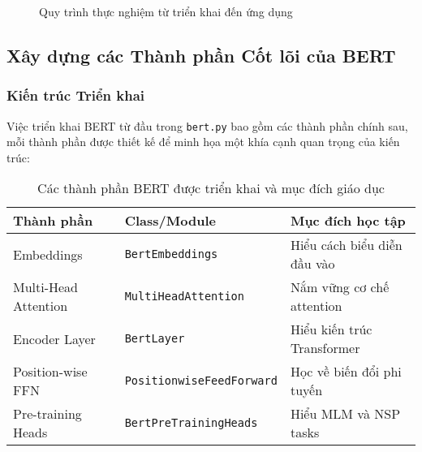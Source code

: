 \begin{figure}[H]
\centering
{}
\caption{Quy trình thực nghiệm từ triển khai đến ứng dụng}
\label{fig:experiment_workflow}
\end{figure}

\subsection{Xây dựng các Thành phần Cốt lõi của BERT}
\label{ssec:xay_dung_cot_loi}

\subsubsection{Kiến trúc Triển khai}
Việc triển khai BERT từ đầu trong \texttt{bert.py} bao gồm các thành phần chính sau, mỗi thành phần được thiết kế để minh họa một khía cạnh quan trọng của kiến trúc:

\begin{table}[H]
\centering
\caption{Các thành phần BERT được triển khai và mục đích giáo dục}
\label{tab:bert_components}
\begin{tabular}{lll}
\toprule
\textbf{Thành phần} & \textbf{Class/Module} & \textbf{Mục đích học tập} \\
\midrule
Embeddings & \texttt{BertEmbeddings} & Hiểu cách biểu diễn đầu vào \\
Multi-Head Attention & \texttt{MultiHeadAttention} & Nắm vững cơ chế attention \\
Encoder Layer & \texttt{BertLayer} & Hiểu kiến trúc Transformer \\
Position-wise FFN & \texttt{PositionwiseFeedForward} & Học về biến đổi phi tuyến \\
Pre-training Heads & \texttt{BertPreTrainingHeads} & Hiểu MLM và NSP tasks \\
\bottomrule
\end{tabular}
\end{table}

